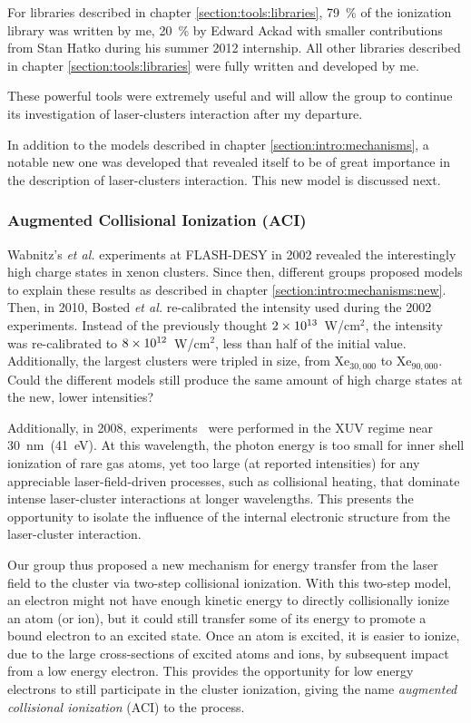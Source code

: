 For libraries described in chapter \ref{section:tools:libraries}, 79~\% of the
ionization library was written by me, 20~\% by Edward Ackad with smaller
contributions from Stan Hatko during his summer 2012 internship. All other
libraries described in chapter \ref{section:tools:libraries} were fully
written and developed by me.

These powerful tools were extremely useful and will allow
the group to continue its investigation of laser-clusters interaction
after my departure.

In addition to the models described in
chapter \ref{section:intro:mechanisms}, a notable new one was
developed that revealed itself to be of great importance in the description of
laser-clusters interaction. This new model is discussed next.


\subsubsection{Augmented Collisional Ionization (ACI)}

Wabnitz's \textit{et al.} experiments at FLASH-DESY in 2002 revealed the
interestingly high charge states in xenon clusters. Since then, different groups
proposed models to explain these results as described in chapter
\ref{section:intro:mechanisms:new}.
Then, in 2010, Bosted \textit{et al.}
re-calibrated the intensity used during the 2002 experiments.
Instead of the previously thought $\ten{2}{13}$~W/cm$^2$, the intensity was
re-calibrated to $\ten{8}{12}$~W/cm$^2$, less than half of the initial value.
Additionally, the largest clusters were tripled in size, from Xe$_{30,000}$
to Xe$_{90,000}$.
Could the different models still produce the same amount of high charge states
at the new, lower intensities?

Additionally, in 2008, experiments~\cite{Bostedt2008,Murphy2008b} were performed
in the XUV regime near 30~nm~(41~eV). At this wavelength, the photon energy is
too small for inner shell ionization of rare gas atoms, yet too large
(at reported intensities) for any appreciable laser-field-driven processes, such
as collisional heating, that dominate intense laser-cluster interactions at
longer wavelengths. This presents the opportunity to isolate the influence of
the internal electronic structure from the laser-cluster interaction.

Our group thus proposed a new mechanism for energy transfer from the laser field
to the cluster via two-step collisional ionization. With this two-step model, an
electron might not have enough kinetic energy to directly collisionally ionize
an atom (or ion), but it could still transfer some of
its energy to promote a bound electron to an excited state. Once an atom is
excited, it is easier to ionize, due to the large cross-sections of excited
atoms and ions, by subsequent impact from a low energy electron. This provides the
opportunity for low energy electrons to still participate in the cluster
ionization, giving the name \textit{augmented collisional ionization} (ACI) to
the process.

